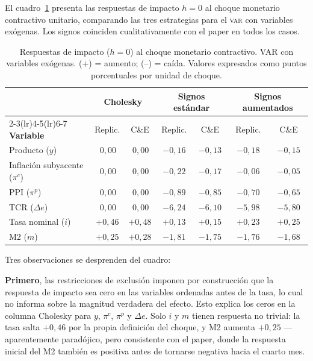 \documentclass[11pt,letterpaper]{article}
\begin{document}
El cuadro~\ref{tab:impacto} presenta las respuestas de impacto $h=0$ al choque monetario contractivo unitario, comparando las tres estrategias para el \textsc{var} con variables exógenas. Los signos coinciden cualitativamente con el paper en todos los casos.

\begin{table}[H]
\centering
\caption{Respuestas de impacto ($h=0$) al choque monetario contractivo. VAR con variables exógenas. (+) = aumento; (--) = caída. Valores expresados como puntos porcentuales por unidad de choque.}
\label{tab:impacto}
\small
\begin{tabular}{@{}lcccccc@{}}
\toprule
& \multicolumn{2}{c}{\textbf{Cholesky}} & \multicolumn{2}{c}{\textbf{Signos estándar}} & \multicolumn{2}{c}{\textbf{Signos aumentados}} \\
\cmidrule(lr){2-3}\cmidrule(lr){4-5}\cmidrule(lr){6-7}
\textbf{Variable} & Replic. & C\&E & Replic. & C\&E & Replic. & C\&E \\
\midrule
Producto ($y$)              & $\,0{,}00$  & $\,0{,}00$  & $-0{,}16$ & $-0{,}13$  & $-0{,}18$ & $-0{,}15$  \\
Inflación subyacente ($\pi^c$) & $\,0{,}00$ & $\,0{,}00$ & $-0{,}22$ & $-0{,}17$  & $-0{,}06$ & $-0{,}05$  \\
PPI ($\pi^p$)               & $\,0{,}00$  & $\,0{,}00$  & $-0{,}89$ & $-0{,}85$  & $-0{,}70$ & $-0{,}65$  \\
TCR ($\Delta e$)            & $\,0{,}00$  & $\,0{,}00$  & $-6{,}24$ & $-6{,}10$  & $-5{,}98$ & $-5{,}80$  \\
Tasa nominal ($i$)          & $+0{,}46$   & $+0{,}48$   & $+0{,}13$ & $+0{,}15$  & $+0{,}23$ & $+0{,}25$  \\
M2 ($m$)                    & $+0{,}25$   & $+0{,}28$   & $-1{,}81$ & $-1{,}75$  & $-1{,}76$ & $-1{,}68$  \\
\bottomrule
\end{tabular}
\end{table}

Tres observaciones se desprenden del cuadro:

\textbf{Primero}, las restricciones de exclusión imponen por construcción que la respuesta de impacto sea cero en las variables ordenadas antes de la tasa, lo cual no informa sobre la magnitud verdadera del efecto. Esto explica los ceros en la columna Cholesky para $y$, $\pi^c$, $\pi^p$ y $\Delta e$. Solo $i$ y $m$ tienen respuesta no trivial: la tasa salta $+0{,}46$ por la propia definición del choque, y M2 aumenta $+0{,}25$ —aparentemente paradójico, pero consistente con el paper, donde la respuesta inicial del M2 también es positiva antes de tornarse negativa hacia el cuarto mes.
\end{document}
